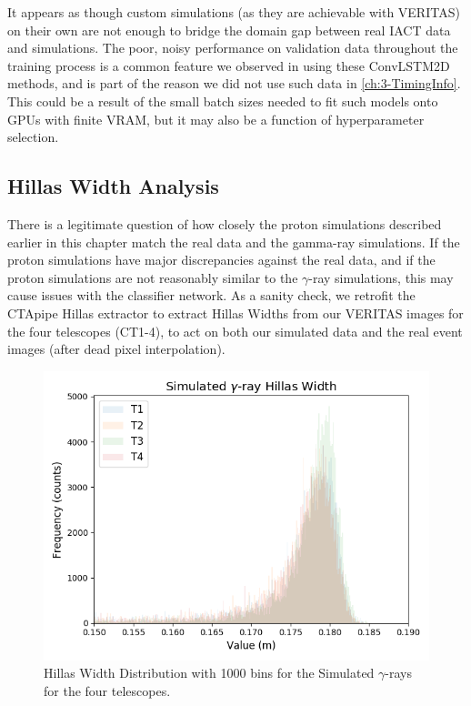 It appears as though custom simulations (as they are achievable with VERITAS) on their own are not enough to bridge the domain gap between real IACT data and simulations. The poor, noisy performance on validation data throughout the training process is a common feature we observed in using these ConvLSTM2D methods, and is part of the reason we did not use such data in \ref{ch:3-TimingInfo}. This could be a result of the small batch sizes needed to fit such models onto GPUs with finite VRAM, but it may also be a function of hyperparameter selection.

\subsection{Hillas Width Analysis}
There is a legitimate question of how closely the proton simulations described earlier in this chapter match the real data and the gamma-ray simulations. If the proton simulations have major discrepancies against the real data, and if the proton simulations are not reasonably similar to the $\gamma$-ray simulations, this may cause issues with the classifier network. As a sanity check, we retrofit the CTApipe Hillas extractor to extract Hillas Widths from our VERITAS images for the four telescopes (CT1-4), to act on both our simulated data and the real event images (after dead pixel interpolation).
\begin{figure}[ht] 
        \centering \includegraphics[width=\columnwidth]{figures/Gamma2_int.png}

        \caption{
                \label{fig:Gamma2_int} Hillas Width Distribution with 1000 bins for the Simulated $\gamma$-rays for the four telescopes.
        }
\end{figure}
